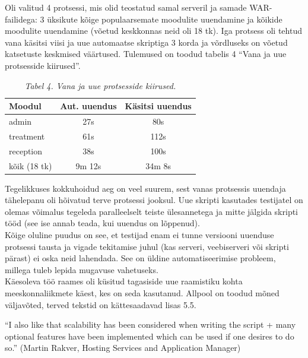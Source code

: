 \documentclass[12pt]{report}
\begin{document}
  Oli valitud 4 protsessi, mis olid teostatud samal serveril ja samade WAR\--failidega: 3 üksikute kõige populaarsemate moodulite uuendamine ja kõikide moodulite uuendamine (võetud keskkonnas neid oli 18 tk). Iga protsess oli tehtud vana käsitsi viisi ja uue automaatse skriptiga 3 korda ja võrdluseks on võetud katsetuste keskmised väärtused. Tulemused on toodud tabelis 4 ``Vana ja uue protsesside kiirused''.
  
  \begin{table}[!htbp]
    \begin{center}
      \caption*{\textit{Tabel 4. Vana ja uue protsesside kiirused.}}
      
      \begin{tabular}{| l | c | c |}
        \hline
         \textbf{Moodul} & \textbf{Aut. uuendus} & \textbf{Käsitsi uuendus}\\
        \hline
        admin & 27s & 80s\\
        treatment & 61s & 112s\\
        reception & 38s & 100s\\
        kõik (18 tk) & 9m 12s & 34m 8s\\
        \hline
      \end{tabular}
    \end{center}
  \end{table}
  
  Tegelikkuses kokkuhoidud aeg on veel suurem, sest vanas protsessis uuendaja tähelepanu oli hõivatud terve protsessi jooksul. Uue skripti kasutades testijatel on olemas võimalus tegeleda paralleelselt teiste ülesannetega ja mitte jälgida skripti tööd (see ise annab teada, kui uuendus on lõppenud).\\
  
  Kõige oluline puudus on see, et testijad enam ei tunne versiooni uuenduse protsessi tausta ja vigade tekitamise juhul (kas serveri, veebiserveri või skripti pärast) ei oska neid lahendada. See on üldine automatiseerimise probleem, millega tuleb lepida mugavuse vahetuseks.\\
  
   Käesoleva töö raames oli küsitud tagasiside uue raamistiku kohta meeskonnaliikmete käest, kes on seda kasutanud. Allpool on toodud mõned väljavõted, terved tekstid on kättesaadavad lisas 5.5.\\
   
   \begin{displayquote}
   ``I also like that scalability has been considered when writing the script + many optional features have been implemented which can be used if one desires to do so.'' (Martin Rakver, Hosting Services and Application Manager)
   \end{displayquote}
   
\end{document}
